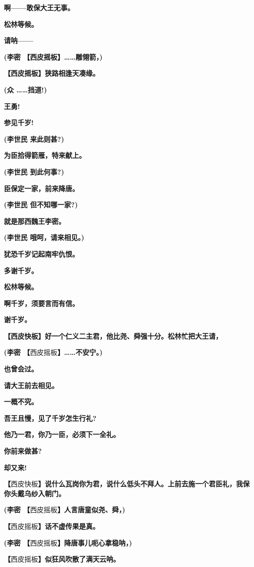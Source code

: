 \textbf{啊------敢保大王无事。}

\textbf{松林等候。}

\textbf{请呐------}

\textbf{(李密 【西皮摇板】\ldots{}\ldots{}雕翎箭，)}

\textbf{【西皮摇板】狭路相逢天凑缘。}

\textbf{(众 \ldots{}\ldots{}挡道!)}

\textbf{王勇!}

\textbf{参见千岁!}

\textbf{(李世民 来此则甚?)}

\textbf{为臣拾得箭雁，特来献上。}

\textbf{(李世民 到此何事?)}

\textbf{臣保定一家，前来降唐。}

\textbf{(李世民 但不知哪一家?)}

\textbf{就是那西魏王李密。}

\textbf{(李世民 哦呵，请来相见。)}

\textbf{犹恐千岁记起南牢仇恨。}

\textbf{多谢千岁。}

\textbf{松林等候。}

\textbf{啊千岁，须要言而有信。}

\textbf{谢千岁。}

\textbf{【西皮快板】好一个仁义二主君，他比尧、舜强十分。松林忙把大王请，}

\textbf{(李密 【}西皮摇板\textbf{】\ldots{}\ldots{}不安宁。)}

\textbf{也曾会过。}

\textbf{请大王前去相见。}

\textbf{一概不究。}

\textbf{吾王且慢，见了千岁怎生行礼?}

\textbf{他乃一君，你乃一臣，必须下一全礼。}

\textbf{你前来做甚?}

\textbf{却又来!}

\textbf{【}西皮快板\textbf{】说什么瓦岗你为君，说什么低头不拜人。上前去施一个君臣礼，我保你头戴乌纱入朝门。}

\textbf{(李密 【}西皮摇板\textbf{】人言唐童似尧、舜，)}

\textbf{【}西皮摇板\textbf{】话不虚传果是真。}

\textbf{(李密 【}西皮摇板\textbf{】降唐事儿呃心拿稳呐，)}

\textbf{【}西皮摇板\textbf{】似狂风吹散了满天云呐。}

